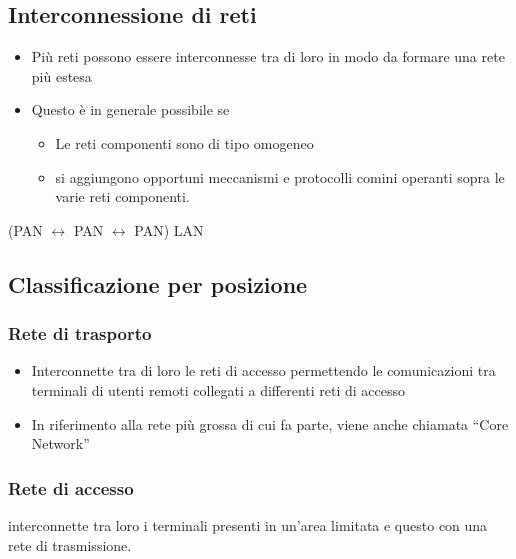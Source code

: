 \documentclass{book}
\begin{document}
\subsection{Interconnessione di reti}
\begin{itemize}
	\item Più reti possono essere interconnesse tra di loro in modo da formare
		una rete più estesa
	\item Questo è in generale possibile se
		\begin{itemize}
			\item Le reti componenti sono di tipo omogeneo
			\item si aggiungono opportuni meccanismi e protocolli comini
				operanti sopra le varie reti componenti.
		\end{itemize}
\end{itemize}
\begin{center}
	\fbox
{
\begin{minipage}{0.30\textwidth}
	(PAN $\leftrightarrow$ PAN $\leftrightarrow$ PAN) LAN
\end{minipage}
}
\end{center}
\subsection{Classificazione per posizione}
\begin{center}
\end{center}
\subsubsection{Rete di trasporto}
\begin{itemize}
	\item Interconnette tra di loro le reti di accesso permettendo le
		comunicazioni tra terminali di utenti remoti collegati a differenti
		reti di accesso
	\item In riferimento alla rete più grossa di cui fa parte, viene anche
		chiamata ``Core Network''
\end{itemize}
\subsubsection{Rete di accesso}
interconnette tra loro i terminali presenti in un'area limitata e questo con
una rete di trasmissione.
\end{document}
